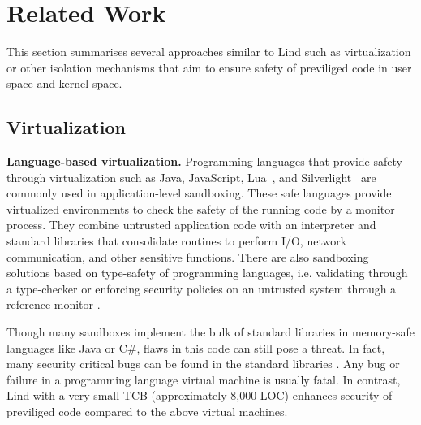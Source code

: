 \section{Related Work}
\label{sec.related_work}
This section summarises several approaches similar to Lind such as virtualization or other isolation mechanisms 
that aim to ensure safety of previliged code in user space and kernel space.


\subsection{Virtualization}
 
\textbf{Language-based virtualization.}
Programming languages that provide safety through virtualization such
as Java, JavaScript, Lua~\cite{Lua}, and
Silverlight~\cite{Silverlight} are commonly used in application-level
sandboxing. These safe languages provide virtualized environments to
check the safety of the running code by a monitor process. They
combine untrusted application code with an interpreter and
standard libraries that consolidate routines to perform I/O, network
communication, and other sensitive functions.
%
There are also sandboxing solutions based on type-safety of programming
languages, i.e. validating through a type-checker \cite{JS-Sandboxing}
or enforcing security policies on an untrusted system through a
reference monitor \cite{JS-Sandboxing1}. %


Though many sandboxes implement the bulk of standard libraries in
memory-safe languages like Java or C\#, flaws in this code can
still pose a threat. In fact, many security critical bugs can be found
in the standard libraries \cite{JavaBugs, Java-Lessons}.
Any bug or failure in a programming language virtual
machine is usually fatal. In contrast, Lind with a very small TCB (approximately
8,000 LOC) enhances security of previliged code compared to the above virtual machines. 

